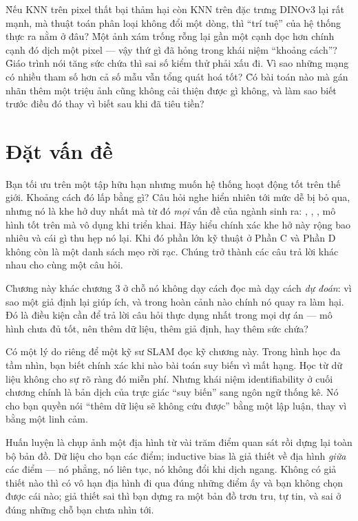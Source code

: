 \documentclass[../../deep_learning.tex]{subfiles}
\begin{document}
\begin{khoigoi}
\h{Nếu KNN trên pixel thất bại thảm hại còn KNN trên đặc trưng DINOv3 lại rất mạnh, mà thuật toán phân loại không đổi một dòng, thì ``trí tuệ'' của hệ thống thực ra nằm ở đâu?}
\h{Một ảnh xám trống rỗng lại gần một cạnh dọc hơn chính cạnh đó dịch một pixel --- vậy thứ gì đã hỏng trong khái niệm ``khoảng cách''?}
\h{Giáo trình nói tăng sức chứa thì sai số kiểm thử phải xấu đi. Vì sao những mạng có nhiều tham số hơn cả số mẫu vẫn tổng quát hoá tốt?}
\h{Có bài toán nào mà gán nhãn thêm một triệu ảnh cũng không cải thiện được gì không, và làm sao biết trước điều đó thay vì biết sau khi đã tiêu tiền?}
\end{khoigoi}

\section{Đặt vấn đề}
Bạn tối ưu trên một tập hữu hạn nhưng muốn hệ thống hoạt động tốt trên thế giới. Khoảng cách đó lấp bằng gì? Câu hỏi nghe hiển nhiên tới mức dễ bị bỏ qua, nhưng nó là khe hở duy nhất mà từ đó \emph{mọi} vấn đề của ngành sinh ra: , , , mô hình tốt trên  mà vô dụng khi triển khai. Hãy hiểu chính xác khe hở này rộng bao nhiêu và cái gì thu hẹp nó lại. Khi đó phần lớn kỹ thuật ở Phần C và Phần D không còn là một danh sách mẹo rời rạc. Chúng trở thành các câu trả lời khác nhau cho cùng một câu hỏi.

Chương này khác chương 3 ở chỗ nó không dạy cách đọc mà dạy cách \emph{dự đoán}: vì sao một giả định lại giúp ích, và trong hoàn cảnh nào chính nó quay ra làm hại. Đó là điều kiện cần để trả lời câu hỏi thực dụng nhất trong mọi dự án --- mô hình chưa đủ tốt, nên thêm dữ liệu, thêm giả định, hay thêm sức chứa?

Có một lý do riêng để một kỹ sư SLAM đọc kỹ chương này. Trong hình học đa tầm nhìn, bạn biết chính xác khi nào bài toán suy biến vì  mất hạng. Học từ dữ liệu không cho sự rõ ràng đó miễn phí. Nhưng khái niệm identifiability ở cuối chương chính là bản dịch của trực giác ``suy biến'' sang ngôn ngữ thống kê. Nó cho bạn quyền nói ``thêm dữ liệu sẽ không cứu được'' bằng một lập luận, thay vì bằng một linh cảm.

\begin{trucgiac}
Huấn luyện là chụp ảnh một địa hình từ vài trăm điểm quan sát rồi dựng lại toàn bộ bản đồ. Dữ liệu cho bạn các điểm; inductive bias là giả thiết về địa hình \emph{giữa} các điểm --- nó phẳng, nó liên tục, nó không đổi khi dịch ngang. Không có giả thiết nào thì có vô hạn địa hình đi qua đúng những điểm ấy và bạn không chọn được cái nào; giả thiết sai thì bạn dựng ra một bản đồ trơn tru, tự tin, và sai ở đúng những chỗ bạn chưa nhìn tới.
\end{trucgiac}
\end{document}
